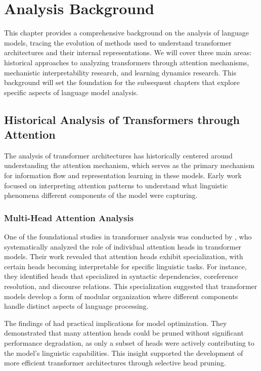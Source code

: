 \chapter{Analysis Background}
\label{sec:analysis-background}

This chapter provides a comprehensive background on the analysis of language models, tracing the evolution of methods used to understand transformer architectures and their internal representations. We will cover three main areas: historical approaches to analyzing transformers through attention mechanisms, mechanistic interpretability research, and learning dynamics research. This background will set the foundation for the subsequent chapters that explore specific aspects of language model analysis.

\section{Historical Analysis of Transformers through Attention}

The analysis of transformer architectures has historically centered around understanding the attention mechanism, which serves as the primary mechanism for information flow and representation learning in these models. Early work focused on interpreting attention patterns to understand what linguistic phenomena different components of the model were capturing.

\subsection{Multi-Head Attention Analysis}

One of the foundational studies in transformer analysis was conducted by \citet{voita2019analyzing}, who systematically analyzed the role of individual attention heads in transformer models. Their work revealed that attention heads exhibit specialization, with certain heads becoming interpretable for specific linguistic tasks. For instance, they identified heads that specialized in syntactic dependencies, coreference resolution, and discourse relations. This specialization suggested that transformer models develop a form of modular organization where different components handle distinct aspects of language processing.

The findings of \citet{voita2019analyzing} had practical implications for model optimization. They demonstrated that many attention heads could be pruned without significant performance degradation, as only a subset of heads were actively contributing to the model's linguistic capabilities. This insight supported the development of more efficient transformer architectures through selective head pruning.

